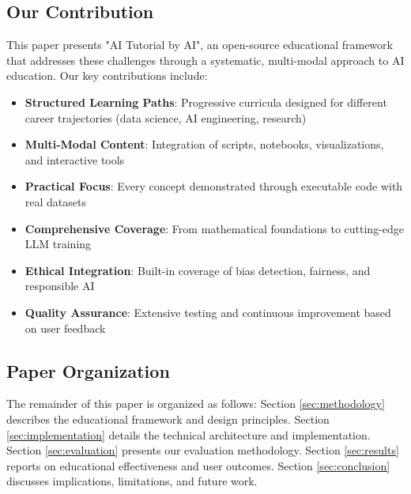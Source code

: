 \subsection{Our Contribution}

This paper presents "AI Tutorial by AI", an open-source educational framework that addresses these challenges through a systematic, multi-modal approach to AI education. Our key contributions include:

\begin{itemize}
    \item \textbf{Structured Learning Paths}: Progressive curricula designed for different career trajectories (data science, AI engineering, research)
    \item \textbf{Multi-Modal Content}: Integration of scripts, notebooks, visualizations, and interactive tools
    \item \textbf{Practical Focus}: Every concept demonstrated through executable code with real datasets
    \item \textbf{Comprehensive Coverage}: From mathematical foundations to cutting-edge LLM training
    \item \textbf{Ethical Integration}: Built-in coverage of bias detection, fairness, and responsible AI
    \item \textbf{Quality Assurance}: Extensive testing and continuous improvement based on user feedback
\end{itemize}

\subsection{Paper Organization}

The remainder of this paper is organized as follows: Section \ref{sec:methodology} describes the educational framework and design principles. Section \ref{sec:implementation} details the technical architecture and implementation. Section \ref{sec:evaluation} presents our evaluation methodology. Section \ref{sec:results} reports on educational effectiveness and user outcomes. Section \ref{sec:conclusion} discusses implications, limitations, and future work.